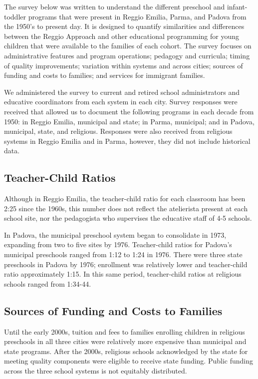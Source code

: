 The survey below was written to understand the different preschool and infant-toddler programs that were present in Reggio Emilia, Parma, and Padova from the 1950's to present day. It is designed to quantify similarities and differences between the Reggio Approach and other educational programming for young children that were available to the families of each cohort. The survey focuses on administrative features and program operations; pedagogy and curricula; timing of quality improvements; variation within systems and across cities; sources of funding and costs to families; and services for immigrant families.

We administered the survey to current and retired school administrators and educative coordinators from each system in each city. Survey responses were received that allowed us to document the following programs in each decade from 1950: in Reggio Emilia, municipal and state; in Parma, municipal; and in Padova, municipal, state, and religious. Responses were also received from religious systems in Reggio Emilia and in Parma, however, they did not include historical data.

\subsection{Teacher-Child Ratios}
Although in Reggio Emilia, the teacher-child ratio for each classroom has been 2:25 since the 1960s, this number does not reflect the atelierista present at each school site, nor the pedagogista who supervises the educative staff of 4-5 schools. 

In Padova, the municipal preschool system began to consolidate in 1973, expanding from two to five sites by 1976. Teacher-child ratios for Padova's municipal preschools ranged from 1:12 to 1:24 in 1976. There were three state preschools in Padova by 1976; enrollment was relatively lower and teacher-child ratio approximately 1:15. In this same period, teacher-child ratios at religious schools ranged from 1:34-44. 
 
\subsection{Sources of Funding and Costs to Families }
Until the early 2000s, tuition and fees to families enrolling children in religious preschools in all three cities were relatively more expensive than municipal and state programs. After the 2000s, religious schools acknowledged by the state for meeting quality components were eligible to receive state funding. Public funding across the three school systems is not equitably distributed. 


